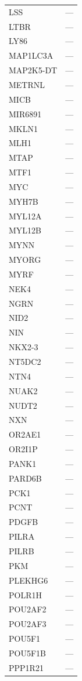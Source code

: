 \begin{longtable}{ll}
  LSS & --- \\
  LTBR & --- \\
  LY86 & --- \\
  MAP1LC3A & --- \\
  MAP2K5-DT & --- \\
  METRNL & --- \\
  MICB & --- \\
  MIR6891 & --- \\
  MKLN1 & --- \\
  MLH1 & --- \\
  MTAP & --- \\
  MTF1 & --- \\
  MYC & --- \\
  MYH7B & --- \\
  MYL12A & --- \\
  MYL12B & --- \\
  MYNN & --- \\
  MYORG & --- \\
  MYRF & --- \\
  NEK4 & --- \\
  NGRN & --- \\
  NID2 & --- \\
  NIN & --- \\
  NKX2-3 & --- \\
  NT5DC2 & --- \\
  NTN4 & --- \\
  NUAK2 & --- \\
  NUDT2 & --- \\
  NXN & --- \\
  OR2AE1 & --- \\
  OR2I1P & --- \\
  PANK1 & --- \\
  PARD6B & --- \\
  PCK1 & --- \\
  PCNT & --- \\
  PDGFB & --- \\
  PILRA & --- \\
  PILRB & --- \\
  PKM & --- \\
  PLEKHG6 & --- \\
  POLR1H & --- \\
  POU2AF2 & --- \\
  POU2AF3 & --- \\
  POU5F1 & --- \\
  POU5F1B & --- \\
  PPP1R21 & --- \\

\end{longtable}
